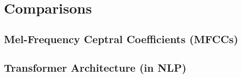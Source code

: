 \chapter{Comparisons}

\section{Mel-Frequency Ceptral Coefficients (MFCCs)}

\section{Transformer Architecture (in NLP)}
